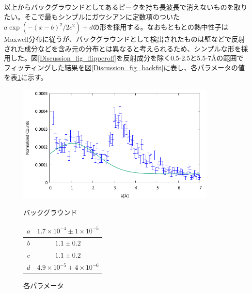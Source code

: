 以上からバックグラウンドとしてあるピークを持ち長波長で消えないものを取りたい。そこで最もシンプルにガウシアンに定数項のついた$a\exp(-(x-b)^2/2c^2)+d$の形を採用する。なおもともとの熱中性子はMaxwell分布に従うが、バックグラウンドとして検出されたものは壁などで反射された成分などを含み元の分布とは異なると考えられるため、シンプルな形を採用した。図\ref{Discussion_fig_flipperoff}を反射成分を除く0.5-2.5と5.5-7\AA の範囲でフィッティングした結果を図\ref{Discussion_fig_backfit}に表し、各パラメータの値を表\ref{Discussion_tbl_backfit}に示す。

\begin{figure}[H]
\begin{minipage}{0.7\hsize}
\centering
\includegraphics[width=10cm]{discussion/BG/background.pdf}
\caption{バックグラウンド} \label{Discussion_fig_backfit}
\end{minipage}
\begin{minipage}{0.3\hsize}
\centering
\makeatletter
\def\@captype{table}
\makeatother
\caption{各パラメータ} \label{Discussion_tbl_backfit}
\begin{tabular}{|c|c|} \hline
$a$&$1.7\times 10^{-4}\pm 1\times10^{-5}$\\ \hline
$b$&$1.1\pm0.2$\\ \hline
$c$&$1.1\pm0.2$\\ \hline
$d$&$4.9\times 10^{-5}\pm4\times 10^{-6}$\\ \hline
\end{tabular}
\end{minipage}
\end{figure}

